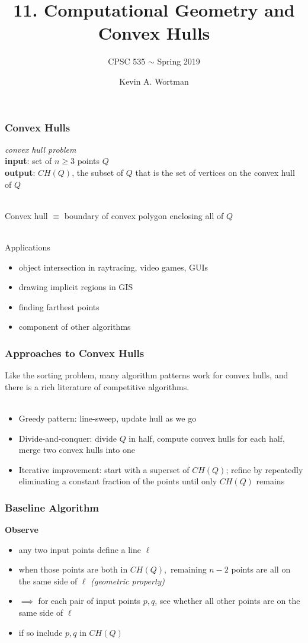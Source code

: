 \documentclass{beamer}
\title{11. Computational Geometry and Convex Hulls}
\subtitle{CPSC 535 $\sim$ Spring 2019}
\author{Kevin A. Wortman}
\institute{ \texttt{[image: csuf-logo-cmyk]} }
\date{November 18, 2019 \stanza

\texttt{[image: by]} \\

{\tiny
This work is licensed under a
\href{http://creativecommons.org/licenses/by/4.0/}{Creative Commons Attribution 4.0 International License}.
}}
\newcommand{\stanza}{ \\~\ }
\begin{document}
\begin{frame}
  \titlepage
\end{frame}

\begin{frame} \frametitle{Convex Hulls}
\emph{convex hull problem} \\
\textbf{input}: set of $n \geq 3$ points $Q$ \\
\textbf{output}: $CH(Q)$, the subset of $Q$ that is the set of vertices on
  the convex hull of $Q$ \stanza

Convex hull $\equiv$ boundary of convex polygon enclosing all of $Q$ \stanza

Applications
\begin{itemize}
  \item object intersection in raytracing, video games, GUIs
  \item drawing implicit regions in GIS
  \item finding farthest points
  \item component of other algorithms
\end{itemize}
\end{frame}

\begin{frame} \frametitle{Approaches to Convex Hulls}
Like the sorting problem, many algorithm patterns work for convex hulls,
and there is a rich literature of competitive algorithms. \stanza

\begin{itemize}
  \item Greedy pattern: line-sweep, update hull as we go
  \item Divide-and-conquer: divide $Q$ in half, compute convex hulls for each
    half, merge two convex hulls into one
  \item Iterative improvement: start with a superset of $CH(Q)$; refine by repeatedly eliminating
    a constant fraction of the points until only $CH(Q)$ remains
\end{itemize}
\end{frame}

\begin{frame} \frametitle{Baseline Algorithm}
\textbf{Observe}
\begin{itemize}
  \item any two input points define a line $\ell$
  \item when those points are both in $CH(Q),$ remaining $n-2$ points are all on
    the same side of $\ell$ \emph{(geometric property)}
  \item $\implies$ for each pair of input points $p, q$, see whether all other points
    are on the same side of $\ell$
  \item if so include $p, q$ in $CH(Q)$
\end{itemize}
\end{frame}
\end{document}
